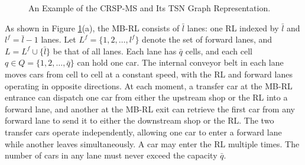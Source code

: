\documentclass[12pt]{article}
\begin{document}
\begin{figure}[htbp]
{
}%

    \caption{An Example of the CRSP-MS and Its TSN Graph Representation. \label{fig2}}

\end{figure}

As shown in Figure \ref{fig2}(a), the MB-RL consists of $\bar{l}$ lanes: one RL indexed by $\bar{l}$ and $l^f=\bar{l}-1$ lanes. Let $L^f=\{1,2,\dots,l^f\}$ denote the set of forward lanes, and $L=L^f\cup \{\bar{l}\}$ be that of all lanes. Each lane has $\bar{q}$ cells, and each cell $q\in Q=\{1,2,\dots,\bar{q}\}$ can hold one car. %
The internal conveyor belt in each lane moves cars from cell to cell at a constant speed, with the RL and forward lanes operating in opposite directions. At each moment, a transfer car at the MB-RL entrance can dispatch one car from either the upstream shop or the RL into a forward lane, and another at the MB-RL exit can retrieve the first car from any forward lane to send it to either the downstream shop or the RL. The two transfer cars operate independently, allowing one car to enter a forward lane while another leaves simultaneously. A car may enter the RL multiple times. The number of cars in any lane must never exceed the capacity $\bar{q}$.
\end{document}
